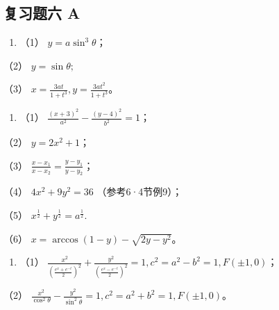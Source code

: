 \subsection{复习题六 A}\label{ux590dux4e60ux9898ux516d-a-1}

\begin{enumerate}
\def\labelenumi{\arabic{enumi}.}
\tightlist
\item
  （1） \(y = a \sin^3 \theta\)；
\end{enumerate}

（2） \(y = \sin \theta;\)

（3） \(x = \frac{3at}{1 + t^3}, y = \frac{3at^2}{1 + t^3}\)。

\begin{enumerate}
\def\labelenumi{\arabic{enumi}.}
\setcounter{enumi}{1}
\tightlist
\item
  （1） \(\frac{(x + 3)^2}{a^2} - \frac{(y - 4)^2}{b^2} = 1\)；
\end{enumerate}

（2） \(y = 2x^{2} + 1\)；

（3） \(\frac{x - x_1}{x - x_2} = \frac{y - y_1}{y - y_2}\)；

（4） \(4x^{2} + 9y^{2} = 36\) （参考6·4节例9）；

（5） \(x^{\frac{1}{2}} + y^{\frac{1}{2}} = a^{\frac{1}{2}}.\)

（6） \(x = \arccos (1 - y) - \sqrt{2y - y^2}\)。

\begin{enumerate}
\def\labelenumi{\arabic{enumi}.}
\setcounter{enumi}{3}
\tightlist
\item
  （1）
  \(\frac{x^2}{\left(\frac{e^x + e^{-t}}{2}\right)^2} + \frac{y^2}{\left(\frac{e^x - e^{-t}}{2}\right)^2} = 1, c^2 = a^2 - b^2 = 1, F(\pm 1, 0)\)；
\end{enumerate}

（2）
\(\frac{x^2}{\cos^2\theta} - \frac{y^2}{\sin^2\theta} = 1, c^2 = a^2 + b^2 = 1, F(\pm 1, 0)\)。

